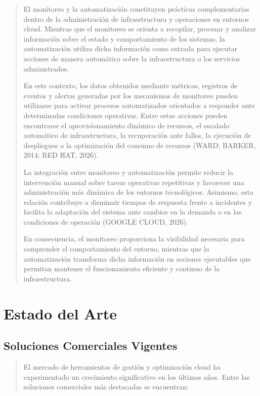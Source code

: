 \documentclass[
]{article}
\begin{document}
\begin{quote}
El monitoreo y la automatización constituyen prácticas complementarias
dentro de la administración de infraestructura y operaciones en entornos
cloud. Mientras que el monitoreo se orienta a recopilar, procesar y
analizar información sobre el estado y comportamiento de los sistemas,
la automatización utiliza dicha información como entrada para ejecutar
acciones de manera automática sobre la infraestructura o los servicios
administrados.

En este contexto, los datos obtenidos mediante métricas, registros de
eventos y alertas generadas por los mecanismos de monitoreo pueden
utilizarse para activar procesos automatizados orientados a responder
ante determinadas condiciones operativas. Entre estas acciones pueden
encontrarse el aprovisionamiento dinámico de recursos, el escalado
automático de infraestructura, la recuperación ante fallos, la ejecución
de despliegues o la optimización del consumo de recursos (WARD; BARKER,
2014; RED HAT, 2026).

La integración entre monitoreo y automatización permite reducir la
intervención manual sobre tareas operativas repetitivas y favorecer una
administración más dinámica de los entornos tecnológicos. Asimismo, esta
relación contribuye a disminuir tiempos de respuesta frente a incidentes
y facilita la adaptación del sistema ante cambios en la demanda o en las
condiciones de operación (GOOGLE CLOUD, 2026).

En consecuencia, el monitoreo proporciona la visibilidad necesaria para
comprender el comportamiento del entorno, mientras que la automatización
transforma dicha información en acciones ejecutables que permitan
mantener el funcionamiento eficiente y continuo de la infraestructura.
\end{quote}

\section{Estado del Arte}\label{estado-del-arte}

\subsection{Soluciones Comerciales
Vigentes}\label{soluciones-comerciales-vigentes}

\begin{quote}
El mercado de herramientas de gestión y optimización cloud ha
experimentado un crecimiento significativo en los últimos años. Entre
las soluciones comerciales más destacadas se encuentran:
\end{quote}
\end{document}

